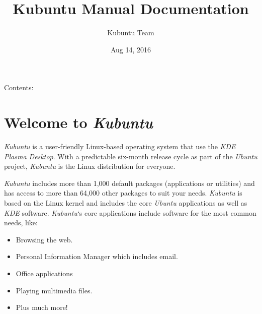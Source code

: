\documentclass[letterpaper,10pt,english]{sphinxmanual}
\title{Kubuntu Manual Documentation}
\date{Aug 14, 2016}
\author{Kubuntu Team}
\begin{document}
\maketitle
\tableofcontents
{}\label{index::doc}


Contents:


\chapter{Welcome to \emph{Kubuntu}}
\label{welcome::doc}\label{welcome:welcome-to-kubuntu-s-documentation}\label{welcome:welcome-to-kubuntu}
\emph{Kubuntu} is a user-friendly Linux-based operating system that use the \emph{KDE} \emph{Plasma Desktop}. With a predictable
six-month release cycle as part of the \emph{Ubuntu} project, \emph{Kubuntu} is the Linux distribution for everyone.

\emph{Kubuntu} includes more than 1,000 default packages (applications or utilities) and has access to more than 64,000 other packages to suit your needs. \emph{Kubuntu} is based on the Linux kernel and includes the core \emph{Ubuntu} applications as well as \emph{KDE} software. \emph{Kubuntu}`s core applications include software for the most common needs, like:
\begin{itemize}
\item {} 
Browsing the web.

\item {} 
Personal Information Manager which includes email.

\item {} 
Office applications

\item {} 
Playing multimedia files.

\item {} 
Plus much more!

\end{itemize}
\end{document}
